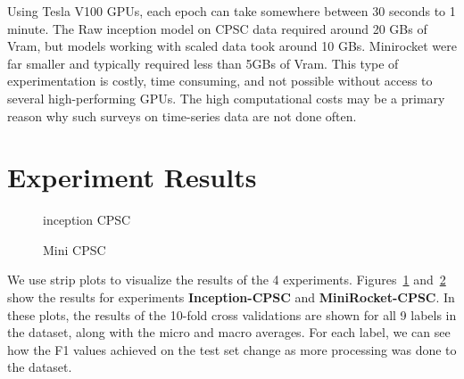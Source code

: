 \documentclass{article}
\begin{document}
Using Tesla V100 GPUs, each epoch can take somewhere between 30 seconds to 1 minute. The Raw inception model on CPSC data required around 20 GBs of Vram, but models working with scaled data took around 10 GBs. Minirocket were far smaller and typically required less than 5GBs of Vram. This type of experimentation is costly, time consuming, and not possible without access to several high-performing GPUs. The high computational costs may be a primary reason why such surveys on time-series data are not done often.


\section{Experiment Results}
\begin{figure}[!tbp]
  \caption{inception CPSC}\label{fig:inception_cpsc}
\end{figure}


\begin{figure}[!tbp]
  \caption{Mini CPSC}\label{fig:mini_cpsc}
\end{figure}


We use strip plots to visualize the results of the 4 experiments. Figures~\ref{fig:inception_cpsc} and~\ref{fig:mini_cpsc} show the results for experiments \textbf{Inception-CPSC} and \textbf{MiniRocket-CPSC}. In these plots, the results of the 10-fold cross validations are shown for all 9 labels in the dataset, along with the micro and macro averages. For each label, we can see how the F1 values achieved on the test set change as more processing was done to the dataset.
\end{document}
